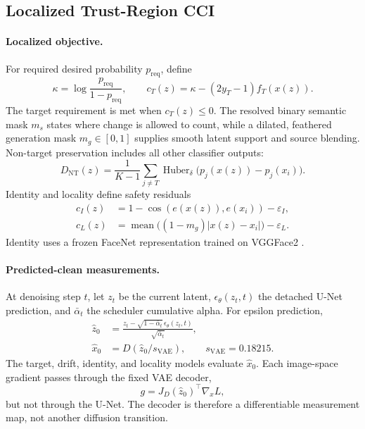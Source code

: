\documentclass[10pt,twocolumn]{article}
\begin{document}
\subsection{Localized Trust-Region CCI}
\label{sec:trust-region}

\paragraph{Localized objective.}
For required desired probability $p_{\mathrm{req}}$, define
\begin{equation}
 \kappa=\log\frac{p_{\mathrm{req}}}{1-p_{\mathrm{req}}},\qquad
 c_T(z)=\kappa-(2y_T-1)f_T(x(z)).
 \label{eq:target-residual}
\end{equation}
The target requirement is met when $c_T(z)\leq0$. The resolved binary semantic
mask $m_s$ states where change is allowed to count, while a dilated, feathered
generation mask $m_g\in[0,1]$ supplies smooth latent support and source
blending. Non-target preservation includes all other classifier outputs:
\begin{equation}
 D_{\mathrm{NT}}(z)=\frac{1}{K-1}\sum_{j\neq T}
 \operatorname{Huber}_{\delta}
 \bigl(p_j(x(z))-p_j(x_i)\bigr).
 \label{eq:drift}
\end{equation}
Identity and locality define safety residuals
\begin{align}
 c_I(z)&=1-\cos(e(x(z)),e(x_i))-\varepsilon_I,\\
 c_L(z)&=\operatorname{mean}\bigl((1-m_g)|x(z)-x_i|\bigr)-\varepsilon_L.
 \label{eq:safety}
\end{align}
Identity uses a frozen FaceNet representation trained on VGGFace2
\cite{schroff2015facenet,cao2018vggface2}.

\paragraph{Predicted-clean measurements.}
At denoising step $t$, let $z_t$ be the current latent,
$\epsilon_\theta(z_t,t)$ the detached U-Net prediction, and $\bar\alpha_t$ the
scheduler cumulative alpha. For epsilon prediction,
\begin{align}
 \hat z_0&=\frac{z_t-\sqrt{1-\bar\alpha_t}\,
                  \epsilon_\theta(z_t,t)}{\sqrt{\bar\alpha_t}},
 \label{eq:pred-clean-latent}\\
 \hat x_0&=D(\hat z_0/s_{\mathrm{VAE}}),\qquad
 s_{\mathrm{VAE}}=0.18215.
 \label{eq:pred-clean-image}
\end{align}
The target, drift, identity, and locality models evaluate $\hat x_0$. Each
image-space gradient passes through the fixed VAE decoder,
\begin{equation}
 g=J_D(\hat z_0)^\top\nabla_x L,
 \label{eq:decoder-jacobian}
\end{equation}
but not through the U-Net. The decoder is therefore a differentiable
measurement map, not another diffusion transition.
\end{document}
